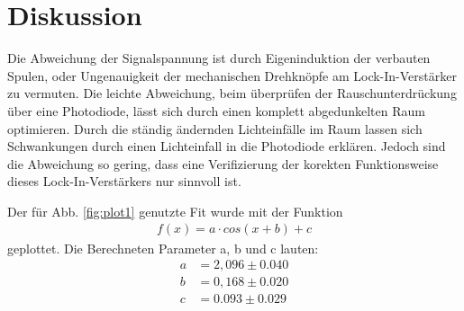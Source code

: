 \section{Diskussion}
\label{sec:Diskussion}
Die Abweichung der Signalspannung ist durch Eigeninduktion der verbauten Spulen, oder Ungenauigkeit der mechanischen Drehknöpfe am Lock-In-Verstärker zu vermuten.
Die leichte Abweichung, beim überprüfen der Rauschunterdrückung über eine Photodiode,
lässt sich durch einen komplett abgedunkelten Raum optimieren.
Durch die ständig ändernden Lichteinfälle im Raum lassen sich Schwankungen durch einen Lichteinfall in die Photodiode erklären.
Jedoch sind die Abweichung so gering, dass eine Verifizierung der korekten Funktionsweise dieses Lock-In-Verstärkers nur sinnvoll ist.

\newpage
Der für Abb. \ref{fig:plot1} genutzte Fit wurde mit der Funktion 
\begin{align}
    f(x) = a \cdot cos(x + b) +c
\end{align}
geplottet. Die Berechneten Parameter a, b und c lauten:
\begin{align}
    a &= 2,096 \pm 0.040 \\
    b &= 0,168 \pm 0.020 \\
    c &= 0.093 \pm 0.029
\end{align}